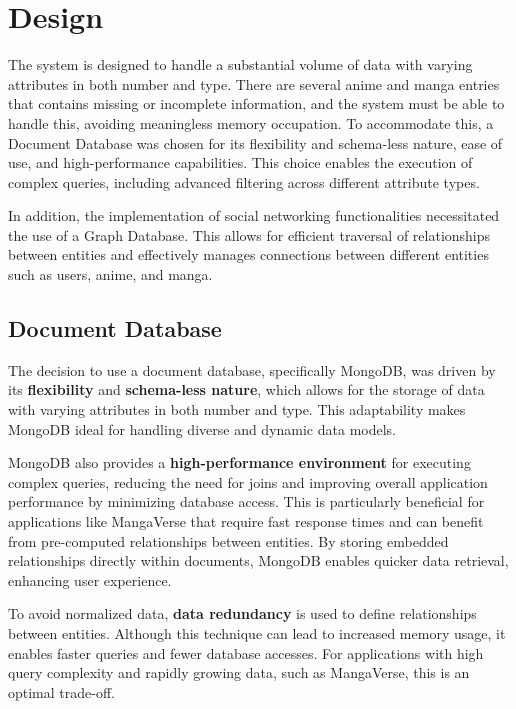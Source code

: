 \chapter{Design}
The system is designed to handle a substantial volume of data with varying attributes in both number and type. 
There are several anime and manga entries that contains missing or incomplete information, 
and the system must be able to handle this, avoiding meaningless memory occupation. To accommodate this, 
a Document Database was chosen for its flexibility and schema-less nature, ease of use, and high-performance 
capabilities. This choice enables the execution of complex queries, including advanced filtering across different attribute types.

\vspace{\baselineskip}

In addition, the implementation of social networking functionalities necessitated the use of a Graph Database. 
This allows for efficient traversal of relationships between entities and effectively manages connections between 
different entities such as users, anime, and manga.


\section{Document Database}

The decision to use a document database, specifically MongoDB,  was driven by its \textbf{flexibility} 
and \textbf{schema-less nature}, which allows for the storage of data with varying attributes in both number and type. 
This adaptability makes MongoDB ideal for handling diverse and dynamic data models.

\vspace{\baselineskip}

MongoDB also provides a \textbf{high-performance environment} for executing complex queries, 
reducing the need for joins and improving overall application performance by minimizing database 
access. This is particularly beneficial for applications like MangaVerse that require fast response 
times and can benefit from pre-computed relationships between entities. By storing embedded 
relationships directly within documents, MongoDB enables quicker data retrieval, enhancing user experience.

\vspace{\baselineskip}

To avoid normalized data, \textbf{data redundancy} is used to define relationships between entities.
Although this technique can lead to increased memory usage, it enables faster queries and fewer 
database accesses. For applications with high query complexity and rapidly growing data, 
such as MangaVerse, this is an optimal trade-off.

